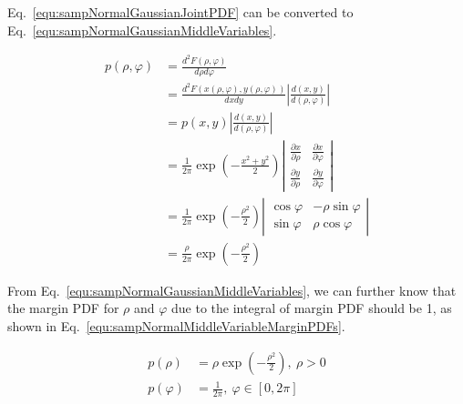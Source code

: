 \documentclass[runningheads,openany]{xhlPaper}
\begin{document}
Eq.~\ref{equ:sampNormalGaussianJointPDF} can be converted to Eq.~\ref{equ:sampNormalGaussianMiddleVariables}.

\begin{equation}
\label{equ:sampNormalGaussianMiddleVariables}
\begin{aligned}
p\left( {\rho ,\varphi } \right) &= \frac{{{d^2}F\left( {\rho ,\varphi } \right)}}{{d\rho d\varphi }}\\
 &= \frac{{{d^2}F\left( {x\left( {\rho ,\varphi } \right),y\left( {\rho ,\varphi } \right)} \right)}}{{dxdy}}|\frac{{d\left( {x,y} \right)}}{{d\left( {\rho ,\varphi } \right)}}|\\
 &= p\left( {x,y} \right)|\frac{{d\left( {x,y} \right)}}{{d\left( {\rho ,\varphi } \right)}}|\\
 &= \frac{1}{{2\pi }}\exp \left( { - \frac{{{x^2} + {y^2}}}{2}} \right)|\begin{array}{*{20}{c}}
{\frac{{\partial x}}{{\partial \rho }}}&{\frac{{\partial x}}{{\partial \varphi }}}\\
{\frac{{\partial y}}{{\partial \rho }}}&{\frac{{\partial y}}{{\partial \varphi }}}
\end{array}|\\
 &= \frac{1}{{2\pi }}\exp \left( { - \frac{{{\rho ^2}}}{2}} \right)|\begin{array}{*{20}{c}}
{\cos \varphi }&{ - \rho \sin \varphi }\\
{\sin \varphi }&{\rho \cos \varphi }
\end{array}|\\
 &= \frac{\rho }{{2\pi }}\exp \left( { - \frac{{{\rho ^2}}}{2}} \right)
\end{aligned}
\end{equation}

From Eq.~\ref{equ:sampNormalGaussianMiddleVariables}, we can further know that the margin PDF for $\rho$ and $\varphi$ due to the integral of margin PDF should be 1, as shown in Eq.~\ref{equ:sampNormalMiddleVariableMarginPDFs}.

\begin{equation}
\label{equ:sampNormalMiddleVariableMarginPDFs}
\begin{aligned}
p\left( \rho  \right) &= \rho \exp \left( { - \frac{{{\rho ^2}}}{2}} \right),\ \rho  > 0\\
p\left( \varphi  \right) &= \frac{1}{{2\pi }},\ \varphi  \in \left[ {0,2\pi } \right]
\end{aligned}
\end{equation}
\end{document}
